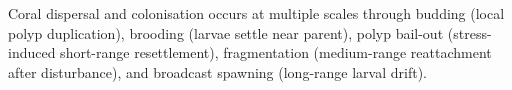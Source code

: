 



Coral dispersal and colonisation occurs at multiple scales through budding (local polyp duplication), brooding (larvae settle near parent), polyp bail-out (stress-induced short-range resettlement), fragmentation (medium-range reattachment after disturbance), and broadcast spawning (long-range larval drift).


